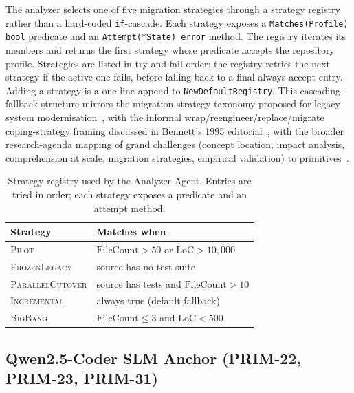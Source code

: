 The analyzer selects one of five migration strategies through a
strategy registry rather than a hard-coded \texttt{if}-cascade. Each
strategy exposes a \texttt{Matches(Profile) bool} predicate and an
\texttt{Attempt(*State) error} method. The registry iterates its
members and returns the first strategy whose predicate accepts the
repository profile. Strategies are listed in try-and-fail order: the
registry retries the next strategy if the active one fails, before
falling back to a final always-accept entry. Adding a strategy is a
one-line append to \texttt{NewDefaultRegistry}.
This cascading-fallback structure mirrors the migration strategy taxonomy proposed for legacy system modernisation~\cite{p60_bisbal_cascading_fallback,p84_s1_test_time_scaling_2025,p108_eagle3_2025,p122_zhang_reasoningbank_2026,p123_wang_codechemist_2026,p135_cemri_specs_2026,p136_huang_cats_2026},
with the informal wrap/reengineer/replace/migrate coping-strategy framing discussed in Bennett's 1995 editorial~\cite{p75_bennett_legacy_coping_success_1995},
with the broader research-agenda mapping of grand challenges (concept location,
impact analysis, comprehension at scale, migration strategies, empirical validation)
to primitives~\cite{p76_bennett_rajlich_roadmap_2000}.

\begin{table}[!t]
\centering
\small
\begin{tabular}{ll}
\toprule
\textbf{Strategy} & \textbf{Matches when} \\
\midrule
\textsc{Pilot} & $\text{FileCount} > 50$ or $\text{LoC} > 10{,}000$ \\
\textsc{FrozenLegacy} & source has no test suite \\
\textsc{ParallelCutover} & source has tests and $\text{FileCount} > 10$ \\
\textsc{Incremental} & always true (default fallback) \\
\textsc{BigBang} & $\text{FileCount} \le 3$ and $\text{LoC} < 500$ \\
\bottomrule
\end{tabular}
\vspace{0.3em}
\caption{Strategy registry used by the Analyzer Agent. Entries are tried
in order; each strategy exposes a predicate and an attempt method.}
\label{tab:strategies}
\end{table}

\subsection{Qwen2.5-Coder SLM Anchor (PRIM-22, PRIM-23, PRIM-31)}
\label{sec:method_qwen25coder_anchor}

